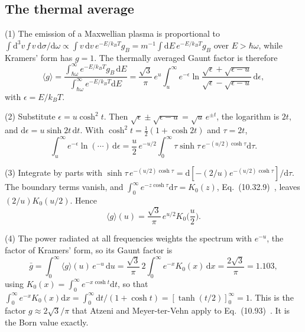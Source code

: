 \documentclass[11pt]{article}
\numberwithin{equation}{section}
\newcommand{\dd}{\mathrm d}
\newcommand{\kB}{k_B}
\begin{document}
\subsection{The thermal average}
{\noindent}(1) The emission of a Maxwellian plasma is proportional to
$\int\dd^3v\,f\,v\,\dd\sigma/\dd\omega\propto\int v\,\dd v\,e^{-E/\kB T}g_B
=m^{-1}\int\dd E\,e^{-E/\kB T}g_B$ over $E>\hbar\omega$, while Kramers' form
has $g=1$. The thermally averaged Gaunt factor is therefore
\begin{equation}
\langle g\rangle=\frac{\int_{\hbar\omega}^\infty e^{-E/\kB T}g_B\,\dd E}{\int_{\hbar\omega}^\infty e^{-E/\kB T}\dd E}
=\frac{\sqrt3}{\pi}\,e^u\int_u^\infty e^{-\epsilon}
\ln\frac{\sqrt\epsilon+\sqrt{\epsilon-u}}{\sqrt\epsilon-\sqrt{\epsilon-u}}\,\dd\epsilon,
\end{equation}
with $\epsilon=E/\kB T$.

{\noindent}(2) Substitute $\epsilon=u\cosh^2t$. Then
$\sqrt\epsilon\pm\sqrt{\epsilon-u}=\sqrt u\,e^{\pm t}$, the logarithm is $2t$, and
$\dd\epsilon=u\sinh2t\,\dd t$. With $\cosh^2t=\tfrac12(1+\cosh2t)$ and $\tau=2t$,
\begin{equation}
\int_u^\infty e^{-\epsilon}\ln(\cdots)\,\dd\epsilon
=\frac u2\,e^{-u/2}\int_0^\infty\tau\sinh\tau\,e^{-(u/2)\cosh\tau}\dd\tau.
\end{equation}

{\noindent}(3) Integrate by parts with
$\sinh\tau\,e^{-(u/2)\cosh\tau}=\dd[-(2/u)e^{-(u/2)\cosh\tau}]/\dd\tau$. The
boundary terms vanish, and $\int_0^\infty e^{-z\cosh\tau}\dd\tau=K_0(z)$,
Eq.~(10.32.9)~\cite{DLMF}, leaves $(2/u)K_0(u/2)$. Hence
\begin{equation}
\boxed{\;\langle g\rangle(u)=\frac{\sqrt3}{\pi}\,e^{u/2}K_0\Big(\frac u2\Big).\;}
\label{eq:gaunt-avg}
\end{equation}

{\noindent}(4) The power radiated at all frequencies weights the spectrum
with $e^{-u}$, the factor of Kramers' form, so its Gaunt factor is
\begin{equation}
\boxed{\;\bar g=\int_0^\infty\langle g\rangle(u)\,e^{-u}\,\dd u=\frac{\sqrt3}{\pi}\,2\int_0^\infty e^{-x}K_0(x)\,\dd x
=\frac{2\sqrt3}{\pi}=1.103,\;}
\label{eq:gaunt-power}
\end{equation}
using $K_0(x)=\int_0^\infty e^{-x\cosh t}\dd t$, so that
$\int_0^\infty e^{-x}K_0(x)\dd x=\int_0^\infty\dd t/(1+\cosh t)=[\tanh(t/2)]_0^\infty=1$.
This is the factor $g\approx2\sqrt3/\pi$ that
Atzeni and Meyer-ter-Vehn apply to Eq.~(10.93)~\cite{Atzeni2004}. It is the
Born value exactly.
\end{document}
